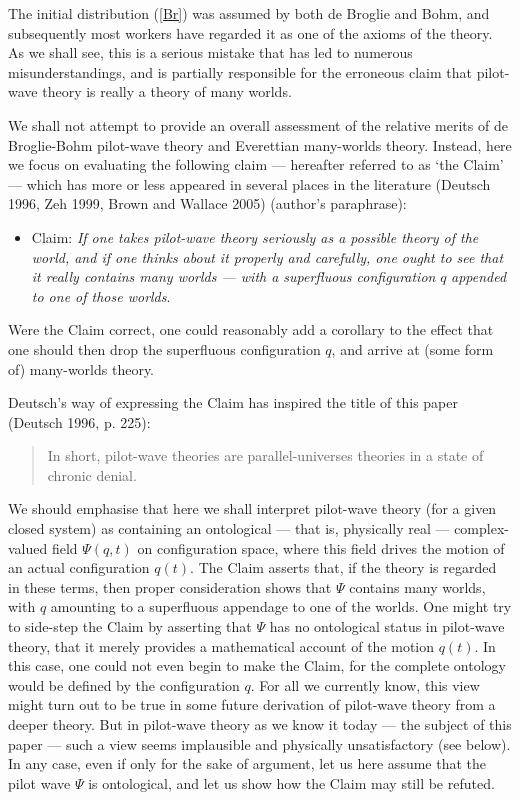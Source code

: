 \documentclass[12pt]{article}%
\begin{document}
The initial distribution (\ref{Br}) was assumed by both de Broglie and Bohm,
and subsequently most workers have regarded it as one of the axioms of the
theory. As we shall see, this is a serious mistake that has led to numerous
misunderstandings, and is partially responsible for the erroneous claim that
pilot-wave theory is really a theory of many worlds.

We shall not attempt to provide an overall assessment of the relative merits
of de Broglie-Bohm pilot-wave theory and Everettian many-worlds theory.
Instead, here we focus on evaluating the following claim --- hereafter
referred to as `the Claim' --- which has more or less appeared in several
places in the literature (Deutsch 1996, Zeh 1999, Brown and Wallace 2005)
(author's paraphrase):

\begin{itemize}
\item Claim: \textit{If one takes pilot-wave theory seriously as a possible
theory of the world, and if one thinks about it properly and carefully, one
ought to see that it really contains many worlds --- with a superfluous
configuration }$q$\textit{ appended to one of those worlds}.
\end{itemize}
Were the Claim correct, one could reasonably add a corollary to the
effect that one should then drop the superfluous configuration $q$, and arrive
at (some form of) many-worlds theory.

Deutsch's way of expressing the Claim has inspired the title of this paper
(Deutsch 1996, p. 225):

\begin{quote}
In short, pilot-wave theories are parallel-universes theories in a state of
chronic denial.
\end{quote}

We should emphasise that here we shall interpret pilot-wave theory (for a
given closed system) as containing an ontological --- that is, physically real
--- complex-valued field $\Psi(q,t)$ on configuration space, where this field
drives the motion of an actual configuration $q(t)$. The Claim asserts that,
if the theory is regarded in these terms, then proper consideration shows that
$\Psi$ contains many worlds, with $q$ amounting to a superfluous appendage to
one of the worlds. One might try to side-step the Claim by asserting that
$\Psi$ has no ontological status in pilot-wave theory, that it merely provides
a mathematical account of the motion $q(t)$. In this case, one could not even
begin to make the Claim, for the complete ontology would be defined by the
configuration $q$. For all we currently know, this view might turn out to be
true in some future derivation of pilot-wave theory from a deeper theory. But
in pilot-wave theory as we know it today --- the subject of this paper ---
such a view seems implausible and physically unsatisfactory (see below). In
any case, even if only for the sake of argument, let us here assume that the
pilot wave $\Psi$ is ontological, and let us show how the Claim may still be refuted.
\end{document}
